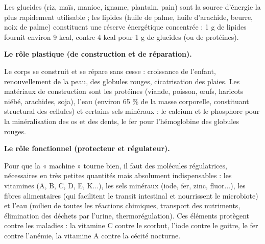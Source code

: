 \documentclass[11pt]{article}
\newcommand{\cle}[1]{{\popxbold\color{popdark}#1}}
\begin{document}
Les glucides (riz, maïs, manioc, igname, plantain, pain) sont la source d'énergie la plus rapidement utilisable ; les lipides (huile de palme, huile d'arachide, beurre, noix de palme) constituent une réserve énergétique concentrée : 1 g de lipides fournit environ 9 kcal, contre 4 kcal pour 1 g de glucides (ou de protéines).

\textbf{Le rôle plastique (de construction et de réparation).}\par

Le corps se construit et se répare sans cesse : croissance de l'enfant, renouvellement de la peau, des globules rouges, cicatrisation des plaies. Les matériaux de construction sont les \cle{protéines} (viande, poisson, œufs, haricots niébé, arachides, soja), l'\cle{eau} (environ 65 \% de la masse corporelle, constituant structural des cellules) et certains \cle{sels minéraux} : le \cle{calcium} et le \cle{phosphore} pour la minéralisation des os et des dents, le \cle{fer} pour l'hémoglobine des globules rouges.

\textbf{Le rôle fonctionnel (protecteur et régulateur).}\par

Pour que la « machine » tourne bien, il faut des molécules régulatrices, nécessaires en très petites quantités mais absolument indispensables : les \cle{vitamines} (A, B, C, D, E, K...), les \cle{sels minéraux} (iode, fer, zinc, fluor...), les \cle{fibres} alimentaires (qui facilitent le transit intestinal et nourrissent le microbiote) et l'\cle{eau} (milieu de toutes les réactions chimiques, transport des nutriments, élimination des déchets par l'urine, thermorégulation). Ces éléments protègent contre les maladies : la vitamine C contre le scorbut, l'iode contre le goitre, le fer contre l'anémie, la vitamine A contre la cécité nocturne.
\end{document}
